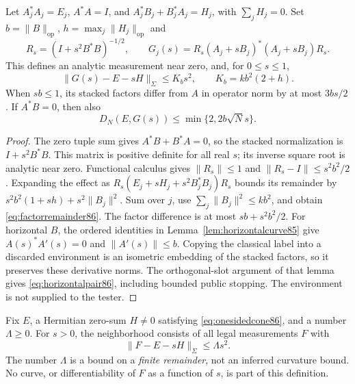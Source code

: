 \begin{lemma}\label{lem:factorremainder86}
Let $A_j^*A_j=E_j$, $A^*A=I$, and
$A_j^*B_j+B_j^*A_j=H_j$, with $\sum_jH_j=0$.
Set $b=\|B\|_{\mathrm{op}}$, $h=\max_j\|H_j\|_{\mathrm{op}}$ and
\[
 R_s=(I+s^2B^*B)^{-1/2},\qquad
 G_j(s)=R_s(A_j+sB_j)^*(A_j+sB_j)R_s.
\]
This defines an analytic measurement near zero, and, for $0\le s\le1$,
\begin{equation}\label{eq:factorremainder86}
 \|G(s)-E-sH\|_{\Sigma}\le K_b s^2,
 \qquad K_b=kb^2(2+h).
\end{equation}
When $sb\le1$, its stacked factors differ from $A$ in operator norm
by at most $3bs/2$.  If $A^*B=0$, then also
\begin{equation}\label{eq:horizontalpair86}
 D_N(E,G(s))\le\min\{2,2b\sqrt N s\}.
\end{equation}
\end{lemma}
\begin{proof}
The zero tuple sum gives $A^*B+B^*A=0$, so the stacked normalization
is $I+s^2B^*B$.  This matrix is positive definite for all real $s$;
its inverse square root is analytic near zero.  Functional calculus
gives $\|R_s\|\le1$ and $\|R_s-I\|\le s^2b^2/2$.
Expanding the effect as
$R_s(E_j+sH_j+s^2B_j^*B_j)R_s$ bounds its remainder by
$s^2b^2(1+sh)+s^2\|B_j\|^2$.  Sum over $j$, use
$\sum_j\|B_j\|^2\le kb^2$, and obtain \eqref{eq:factorremainder86}.
The factor difference is at most $sb+s^2b^2/2$.
For horizontal $B$, the ordered identities in
Lemma~\ref{lem:horizontalcurve85} give $A(s)^*A'(s)=0$ and
$\|A'(s)\|\le b$.  Copying the classical label into a discarded
environment is an isometric embedding of the stacked factors, so
it preserves these derivative norms.  The orthogonal-slot argument
of that lemma gives \eqref{eq:horizontalpair86}, including bounded
public stopping.  The environment is not supplied to the tester.
\end{proof}

\begin{definition}\label{def:tangenttube86}
Fix $E$, a Hermitian zero-sum $H\ne0$ satisfying
\eqref{eq:onesidedcone86}, and a number $\Lambda\ge0$.
For $s>0$, the neighborhood consists of all legal measurements $F$
with
\begin{equation}\label{eq:tangenttube86}
 \|F-E-sH\|_{\Sigma}\le\Lambda s^2.
\end{equation}
The number $\Lambda$ is a bound on a \emph{finite remainder}, not an
inferred curvature bound.  No curve, or differentiability of $F$ as
a function of $s$, is part of this definition.
\end{definition}

